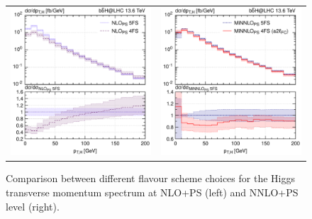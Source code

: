 \documentclass[11pt,a4paper]{article}
\begin{document}
\begin{figure}[t!]
\begin{center}
\begin{tabular}{cc}
\includegraphics[width=.45\textwidth, page=1]{plots/4fs/pt_Higgs_NLO_5FS_4FS.pdf}&
\includegraphics[width=.45\textwidth, page=1]{plots/4fs/pt_Higgs_minnlops_5FS_4FS-FC.pdf}
\end{tabular}
\vspace*{1ex}
\caption{Comparison between different flavour scheme choices for the Higgs transverse momentum spectrum at NLO+PS (left) and NNLO+PS level (right). \label{fig:4fsA}}
\end{center}
\end{figure}
\end{document}
